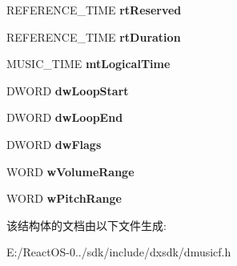 \begin{DoxyCompactItemize}
R\+E\+F\+E\+R\+E\+N\+C\+E\+\_\+\+T\+I\+ME {\bfseries rt\+Reserved}
\item 
\mbox{\label{struct___d_m_u_s___i_o___w_a_v_e___i_t_e_m___h_e_a_d_e_r_a1628f38a062d13adecd5e6e7203192e6}} 
R\+E\+F\+E\+R\+E\+N\+C\+E\+\_\+\+T\+I\+ME {\bfseries rt\+Duration}
\item 
\mbox{\label{struct___d_m_u_s___i_o___w_a_v_e___i_t_e_m___h_e_a_d_e_r_a512dd9106cfed08efeb099e7df43f8f4}} 
M\+U\+S\+I\+C\+\_\+\+T\+I\+ME {\bfseries mt\+Logical\+Time}
\item 
\mbox{\label{struct___d_m_u_s___i_o___w_a_v_e___i_t_e_m___h_e_a_d_e_r_ab3a51c42449f57f4ae67ed557962a671}} 
D\+W\+O\+RD {\bfseries dw\+Loop\+Start}
\item 
\mbox{\label{struct___d_m_u_s___i_o___w_a_v_e___i_t_e_m___h_e_a_d_e_r_a861fdba4bd1955886c61c3445e3d4d7d}} 
D\+W\+O\+RD {\bfseries dw\+Loop\+End}
\item 
\mbox{\label{struct___d_m_u_s___i_o___w_a_v_e___i_t_e_m___h_e_a_d_e_r_a2b153f4569fc00a1473ef5273833969c}} 
D\+W\+O\+RD {\bfseries dw\+Flags}
\item 
\mbox{\label{struct___d_m_u_s___i_o___w_a_v_e___i_t_e_m___h_e_a_d_e_r_a3de56ca2f6d21187c22f6beda918d1c9}} 
W\+O\+RD {\bfseries w\+Volume\+Range}
\item 
\mbox{\label{struct___d_m_u_s___i_o___w_a_v_e___i_t_e_m___h_e_a_d_e_r_aceace565c69b2054b30e2d437c9a622d}} 
W\+O\+RD {\bfseries w\+Pitch\+Range}
\end{DoxyCompactItemize}


该结构体的文档由以下文件生成\+:\begin{DoxyCompactItemize}
\item 
E\+:/\+React\+O\+S-\/0../sdk/include/dxsdk/dmusicf.\+h\end{DoxyCompactItemize}

